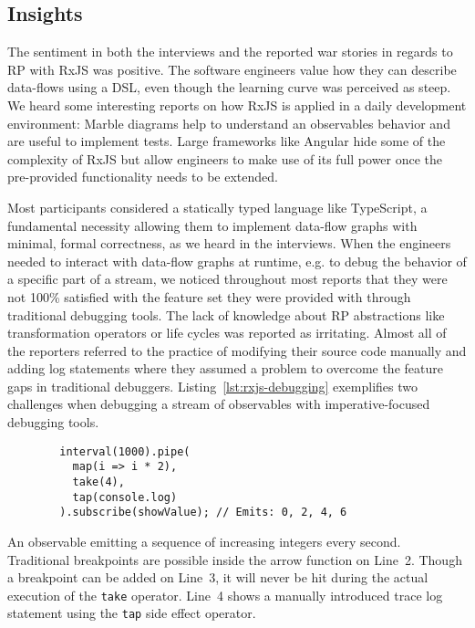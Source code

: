 \documentclass[sigplan,screen,review]{acmart}
\begin{document}
\subsection{Insights}

The sentiment in both the interviews and the reported war stories in regards to RP with RxJS was positive. The software engineers value how they can describe data-flows using a DSL, even though the learning curve was perceived as steep. We heard some interesting reports on how RxJS is applied in a daily development environment: Marble diagrams help to understand  an observables behavior and are useful to implement tests. Large frameworks like Angular hide some of the complexity of RxJS but allow engineers to make use of its full power once the pre-provided functionality needs to be extended.

Most participants considered a statically typed language like TypeScript, a fundamental necessity allowing them to implement data-flow graphs with minimal, formal correctness, as we heard in the interviews. When the engineers needed to interact with data-flow graphs at runtime, e.g. to debug the behavior of a specific part of a stream, we noticed throughout most reports that they were not 100\% satisfied with the feature set they were provided with through traditional debugging tools. The lack of knowledge about RP abstractions like transformation operators or life cycles was reported as irritating. Almost all of the reporters referred to the practice of modifying their source code manually and adding log statements where they assumed a problem to overcome the feature gaps in traditional debuggers. Listing~\ref{lst:rxjs-debugging} exemplifies two challenges when debugging a stream of observables with imperative-focused debugging tools.

\begin{listing}
	\begin{verbatim}
		interval(1000).pipe(
		  map(i => i * 2),
		  take(4),
		  tap(console.log)
		).subscribe(showValue); // Emits: 0, 2, 4, 6
	\end{verbatim}
	\caption{An observable emitting a sequence of increasing integers every second. Traditional breakpoints are possible inside the arrow function on Line~2. Though a breakpoint can be added on Line~3, it will never be hit during the actual execution of the \texttt{take} operator. Line~4 shows a manually introduced trace log statement using the \texttt{tap} side effect operator.}
	\label{lst:rxjs-debugging}
\end{listing}
\end{document}
